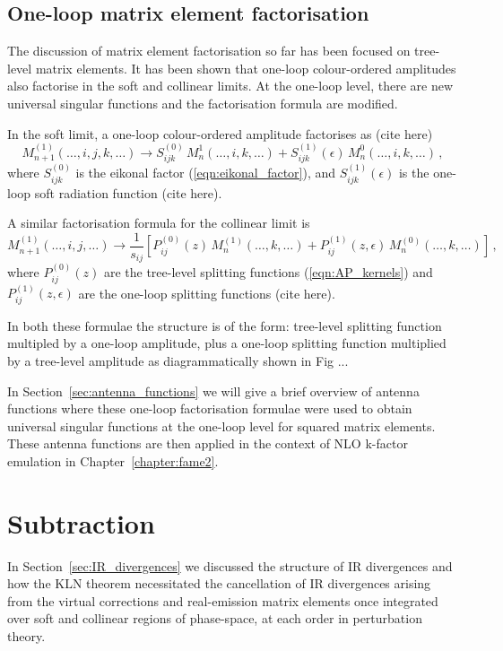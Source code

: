 \documentclass[main.tex]{subfiles}
\begin{document}
\subsection{One-loop matrix element factorisation}\label{sec:OL_factorisation}
    The discussion of matrix element factorisation so
    far has been focused on tree-level matrix elements.
    It has been shown that one-loop colour-ordered amplitudes
    also factorise in the soft and collinear limits. At the one-loop level,
    there are new universal singular functions and the
    factorisation formula are modified.

    In the soft limit, a one-loop colour-ordered amplitude
    factorises as (cite here)
    \begin{equation}\label{eqn:1L_soft_factorisation}
        M_{n+1}^{(1)}(\ldots, i, j, k, \ldots) \rightarrow S_{ijk}^{(0)} \, M_{n}^{1}(\ldots, i, k, \ldots) + S_{ijk}^{(1)}(\epsilon) \, M_{n}^{0}(\ldots, i, k, \ldots) \, ,
    \end{equation}
    where $S_{ijk}^{(0)}$ is the eikonal factor (\ref{eqn:eikonal_factor}),
    and $S_{ijk}^{(1)}(\epsilon)$ is the one-loop soft radiation function (cite here).

    A similar factorisation formula for the collinear limit is
    \begin{equation}\label{eqn:1L_collinear_factorisation}
        M_{n+1}^{(1)}(\ldots, i, j, \ldots) \rightarrow \dfrac{1}{s_{ij}} \left[ P_{ij}^{(0)}(z) \, M_{n}^{(1)}(\ldots, k, \ldots) + P_{ij}^{(1)}(z, \epsilon) \, M_{n}^{(0)}(\ldots, k, \ldots) \right] \, ,
    \end{equation}
    where $P_{ij}^{(0)}(z)$ are the tree-level splitting functions
    (\ref{eqn:AP_kernels}) and $P_{ij}^{(1)}(z, \epsilon)$
    are the one-loop splitting functions (cite here).

    In both these formulae the structure is of the form:
    tree-level splitting function multipled by a one-loop
    amplitude, plus a one-loop splitting function multiplied
    by a tree-level amplitude as diagrammatically shown
    in Fig ...

    In Section~\ref{sec:antenna_functions} we will give
    a brief overview of antenna functions where these one-loop
    factorisation formulae were used to obtain universal singular functions
    at the one-loop level for squared matrix elements. These
    antenna functions are then applied in the context of NLO
    k-factor emulation in Chapter~\ref{chapter:fame2}.

\section{Subtraction}\label{sec:subtraction}
    In Section~\ref{sec:IR_divergences} we discussed the
    structure of IR divergences and how the KLN theorem
    necessitated the cancellation of IR divergences 
    arising from the virtual corrections and real-emission
    matrix elements once integrated over soft and collinear
    regions of phase-space, at each order in perturbation
    theory.
\end{document}
